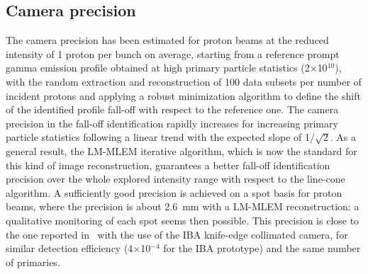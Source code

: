\subsection{Camera precision}
The camera precision has been estimated for proton beams at the reduced intensity of 1 proton per bunch on average, starting from a reference prompt gamma emission profile obtained at high primary particle statistics (2$\times$10$^{10}$), with the random extraction and reconstruction of 100 data subsets per number of incident protons and applying a robust minimization algorithm to define the shift of the identified profile fall-off with respect to the reference one. The camera precision in the fall-off identification rapidly increases for increasing primary particle statistics following a linear trend with the expected slope of 1/$\mathrm{\sqrt{2}}$. As a general result, the LM-MLEM iterative algorithm, which is now the standard for this kind of image reconstruction, guarantees a better fall-off identification precision over the whole explored intensity range with respect to the line-cone algorithm. A sufficiently good precision is achieved on a spot basis for proton beams, where the precision is about 2.6~mm with a LM-MLEM reconstruction: a qualitative monitoring of each spot seems then possible. This precision is close to the one reported in~\cite{Priegnitz2015} with the use of the IBA knife-edge collimated camera, for similar detection efficiency (4$\times$10$\mathrm{^{-4}}$ for the IBA prototype) and the same number of primaries. 

